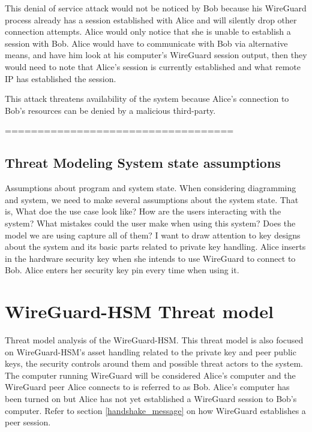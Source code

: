 \documentclass [11pt, proquest] {uwthesis}[2020/02/24]
\begin{document}
This denial of service attack would not be noticed by Bob because his WireGuard process already has a session established with Alice and will silently drop other connection attempts. Alice would only notice that she is unable to establish a session with Bob. Alice would have to communicate with Bob via alternative means, and have him look at his computer's WireGuard session output, then they would need to note that Alice's session is currently established and what remote IP has established the session.

This attack threatens availability of the system because Alice's connection to Bob's resources can be denied by a malicious third-party.

===================================

\subsection{Threat Modeling System state assumptions}
Assumptions about program and system state. When considering diagramming and system, we need to make several assumptions about the system state. That is, What doe the use case look like? How are the users interacting with the system? What mistakes could the user make when using this system? Does the model we are using capture all of them?
I want to draw attention to key designs about the system and its basic parts related to private key handling.
Alice inserts in the hardware security key when she intends to use WireGuard to connect to Bob. Alice enters her security key pin every time when using it. 


\section{WireGuard-HSM Threat model}
\label{wg-hsm-analysis}
Threat model analysis of the WireGuard-HSM. This threat model is also focused on WireGuard-HSM's asset handling related to the private key and peer public keys, the security controls around them and possible threat actors to the system. The computer running WireGuard will be considered Alice's computer and the WireGuard peer Alice connects to is referred to as Bob. Alice's computer has been turned on but Alice has not yet established a WireGuard session to Bob's computer. Refer to section \ref{handshake_message} on how WireGuard establishes a peer session. 
\end{document}
